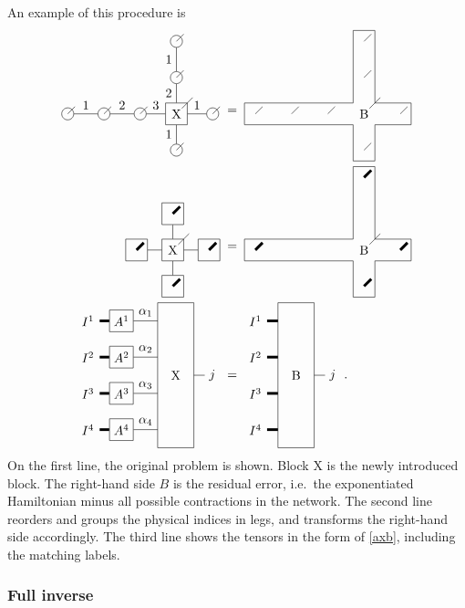 \def \blockct { \begin{tikzpicture}[baseline=3]
    \draw (0,2.5)-- (0,-1.5) -- (1,-1.5)-- (1,2.5) -- cycle;

    \node[draw=none] (x)  at (0.5,0.5) {B};

    \draw[line width=0.75mm] (-0.3,2)  node [left] {$I^1$}  -- (0,2) ;
    \draw[line width=0.75mm] (-0.3,1)  node [left] {$I^2$} -- (0,1);
    \draw[line width=0.75mm] (-0.3,0)  node [left] {$I^3$} -- (0,0);
    \draw[line width=0.75mm] (-0.3,-1)  node [left] {$I^4$} -- (0,-1);

    \draw (1,0.5) -- (1.3,0.5)  node [right] {$j$} ;

  \end{tikzpicture} }

\noindent
An example of this procedure is
\begin{align}
  \pepoat                 \; & =  \;\blockat                                     \\
  \pepobt                 \; & =  \;\blockbt                                     \\
  \vcenter{\hbox{ \pepoct }} & =\vcenter{\hbox{  \blockct }} . \label{extract_x}
\end{align}
On the first line, the original problem is shown. Block X is the newly introduced block. The right-hand side $B$ is the residual error, i.e.\ the exponentiated Hamiltonian minus all possible contractions in the network. The second line reorders and groups the physical indices in legs, and transforms the right-hand side accordingly. The third line shows the tensors in the form of \cref{axb}, including the matching labels.

\subsubsection{Full inverse}

